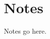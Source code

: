 \documentclass[../main.tex]{subfiles}
\begin{document}
\newpage
\section*{Notes}

Notes go here.

\end{document}
